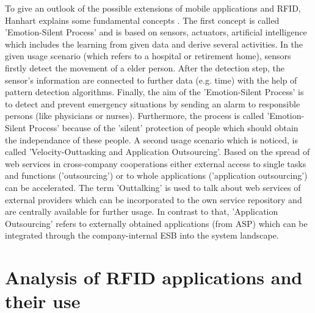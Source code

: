 To give an outlook of the possible extensions of mobile applications and RFID, Hanhart explains some fundamental concepts \cite[p.208 ff.]{mobile}. The first concept is called 'Emotion-Silent Process' and is based on sensors, actuators, artificial intelligence which includes the learning from given data and derive several activities. In the given usage scenario (which refers to a hospital or retirement home), sensors firstly detect the movement of a elder person. After the detection step, the sensor's information are connected to further data (e.g. time) with the help of pattern detection algorithms. Finally, the aim of the 'Emotion-Silent Process' is to detect and prevent emergency situations by sending an alarm to responsible persons (like physicians or nurses). Furthermore, the process is called 'Emotion-Silent Process' because of the 'silent' protection of people which should obtain the independance of these people.
A second usage scenario which is noticed, is called 'Velocity-Outtasking and Application Outsourcing'. Based on the spread of web services in cross-company cooperations either external access to single tasks and functions ('outsourcing') or to whole applications ('application outsourcing') can be accelerated. 
The term 'Outtalking' is used to talk about web services of external providers which can be incorporated to the own service repository and are centrally available for further usage. In contrast to that, 'Application Outsourcing' refers to externally obtained applications (from \ac{ASP}) which can be integrated through the company-internal ESB into the system landscape.

\section{Analysis of RFID applications and their use}

